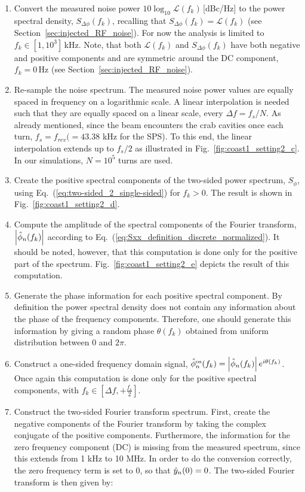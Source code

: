 \begin{enumerate}
    \item  Convert the measured noise power $10\log_{10}\mathcal{L}(f_k)$\,[dBc/Hz] to the power spectral density, $S_{\Delta \phi}(f_k)$, recalling that $S_{\Delta \phi}(f_k) = \mathcal{L}(f_k)$ (see Section~\ref{sec:injected_RF_noise}). For now the analysis is limited to $f_k \in [1, 10^{3}]$\,kHz. Note, that both $\mathcal{L}(f_k)$ and $S_{\Delta \phi}(f_k)$ have both negative and positive components and are symmetric around the DC component, $f_k=0$\,Hz (see Section~\ref{sec:injected_RF_noise}).
    
   

    
    \item Re-sample the noise spectrum. The measured noise power values are equally spaced in frequency on a logarithmic scale. A linear interpolation is needed such that they are equally spaced on a linear scale, every $\Delta f = f_s/N$. As already mentioned, since the beam encounters the crab cavities once each turn, $f_s=f_{rev}(=43.38$ kHz for the SPS). To this end, the linear interpolation extends up to $f_s/2$ as illustrated in Fig.~\ref{fig:coast1_setting2_c}. In our simulations, $N=10^5$ turns are used.
    \item Create the positive spectral components of the two-sided power spectrum, $S_\phi$, using Eq.~(\ref{eq:two-sided_2_single-sided}) for $f_k>0$. The result is shown in Fig.~\ref{fig:coast1_setting2_d}.
    \item Compute the amplitude of the spectral components of the Fourier transform, $\left | \hat{\phi}_n(f_k) \right | $ according to Eq.~(\ref{eq:Sxx_definition_discrete_normalized}). It should be noted, however, that this computation is done only for the positive part of the spectrum. Fig.~\ref{fig:coast1_setting2_e} depicts the result of this computation. 
    \item Generate the phase information for each positive spectral component. By definition the power spectral density does not contain any information about the phase of the frequency components. Therefore, one should generate this information by giving a random phase $\theta(f_k)$ obtained from uniform distribution between 0 and $2\pi$.
    \item Construct a one-sided frequency domain signal, $\hat{\phi}_n^\mathrm{os}(f_k) =\left| \hat{\phi}_n(f_k) \right| e^{{i} \theta(f_k)}$.  Once again this computation is done only for the positive spectral components, with $f_k \in \left[\Delta f,+\frac{f_s}{2} \right ]$.
    \item Construct the two-sided Fourier transform spectrum. First, create the negative components of the Fourier transform by taking the complex conjugate of the positive components. Furthermore, the information for the zero frequency component (DC) is missing from the measured spectrum, since this extends from  1 kHz to 10 MHz. In order to do the conversion correctly, the zero frequency term is set to 0, so that $\hat{y}_n(0)=0$. The two-sided Fourier transform is then given by:
    


\end{enumerate}
